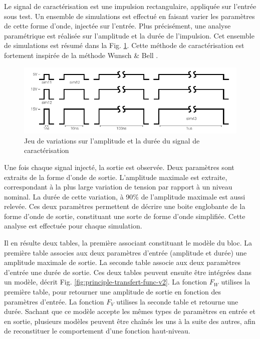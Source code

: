 Le signal de caractérisation est une impulsion rectangulaire, appliquée sur l'entrée sous test.
Un ensemble de simulations est effectué en faisant varier les paramètres de cette forme d'onde, injectée sur l'entrée.
Plus précisément, une analyse paramétrique est réalisée sur l'amplitude et la durée de l'impulsion.
Cet ensemble de simulations est résumé dans la Fig. \ref{set_input_signals}.
Cette méthode de caractérisation est fortement inspirée de la méthode Wunsch & Bell \cite{}.

\begin{figure}[!h]
  \centering
  \includegraphics{src/1/figures/time_domain_cz_curves.pdf}
  \caption{Jeu de variations sur l'amplitude et la durée du signal de caractérisation}
  \label{set_input_signals}
\end{figure}

Une fois chaque signal injecté, la sortie est observée.
Deux paramètres sont extraits de la forme d'onde de sortie.
L'amplitude maximale est extraite, correspondant à la plus large variation de tension par rapport à un niveau nominal.
La durée de cette variation, à 90\% de l'amplitude maximale est aussi relevée.
Ces deux paramètres permettent de décrire une boite englobante de la forme d'onde de sortie, constituant une sorte de forme d'onde simplifiée.
Cette analyse est effectuée pour chaque simulation.

Il en résulte deux tables, la première associant constituant le modèle du bloc.
La première table associes aux deux paramètres d'entrée (amplitude et durée) une amplitude maximale de sortie.
La seconde table associe aux deux paramètres d'entrée une durée de sortie.
Ces deux tables peuvent ensuite être intégrées dans un modèle, décrit Fig. \ref{fig:principle-transfert-func-v2}.
La fonction $F_{W}$ utilises la première table, pour retourner une amplitude de sortie en fonction des paramètres d'entrée.
La fonction $F_{V}$ utilises la seconde table et retourne une durée.
Sachant que ce modèle accepte les mêmes types de paramètres en entrée et en sortie, plusieurs modèles peuvent être chaînés les uns à la suite des autres, afin de reconstituer le comportement d'une fonction haut-niveau.

